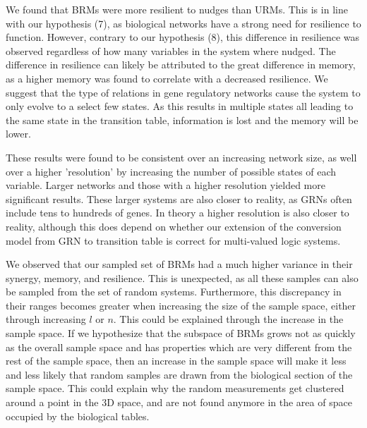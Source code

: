 \documentclass[../main.tex]{subfiles}
\begin{document}
We found that BRMs were more resilient to nudges than URMs.
This is in line with our hypothesis (7), as biological networks have a strong need for resilience to function.
However, contrary to our hypothesis (8), this difference in resilience was observed regardless of how many variables in the system where nudged.
The difference in resilience can likely be attributed to the great difference in memory, as a higher memory was found to correlate with a decreased resilience.
We suggest that the type of relations in gene regulatory networks cause the system to only evolve to a select few states.
As this results in multiple states all leading to the same state in the transition table, information is lost and the memory will be lower.

These results were found to be consistent over an increasing network size, as well over a higher 'resolution' by increasing the number of possible states of each variable.
Larger networks and those with a higher resolution yielded more significant results.
These larger systems are also closer to reality, as GRNs often include tens to hundreds of genes.
In theory a higher resolution is also closer to reality, although this does depend on whether our extension of the conversion model from GRN to transition table is correct for multi-valued logic systems.

We observed that our sampled set of BRMs had a much higher variance in their synergy, memory, and resilience.
This is unexpected, as all these samples can also be sampled from the set of random systems.
Furthermore, this discrepancy in their ranges becomes greater when increasing the size of the sample space, either through increasing $l$ or $n$.
This could be explained through the increase in the sample space.
If we hypothesize that the subspace of BRMs grows not as quickly as the overall sample space and has properties which are very different from the rest of the sample space, then an increase in the sample space will make it less and less likely that random samples are drawn from the biological section of the sample space.
This could explain why the random measurements get clustered around a point in the 3D space, and are not found anymore in the area of space occupied by the biological tables.
\end{document}
